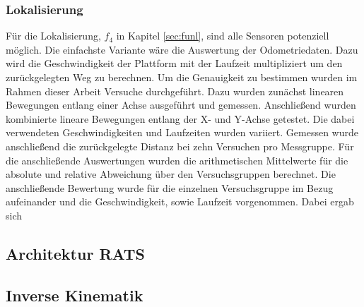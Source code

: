 \subsubsection{Lokalisierung}
Für die Lokalisierung, $f_4$ in Kapitel \ref{sec:funl}, sind alle Sensoren potenziell möglich. Die einfachste Variante wäre die Auswertung der Odometriedaten. Dazu wird die Geschwindigkeit der Plattform mit der Laufzeit multipliziert um den zurückgelegten Weg zu berechnen. Um die Genauigkeit zu bestimmen wurden im Rahmen dieser Arbeit Versuche durchgeführt. Dazu wurden zunächst linearen Bewegungen entlang einer Achse ausgeführt und gemessen. Anschließend wurden kombinierte lineare Bewegungen entlang der X- und Y-Achse getestet. Die dabei verwendeten Geschwindigkeiten und Laufzeiten wurden variiert. Gemessen wurde anschließend die zurückgelegte Distanz bei zehn Versuchen pro Messgruppe. Für die anschließende Auswertungen wurden die arithmetischen Mittelwerte für die absolute und relative Abweichung über den Versuchsgruppen berechnet. Die anschließende Bewertung wurde für die einzelnen Versuchsgruppe im Bezug aufeinander und die Geschwindigkeit, sowie Laufzeit vorgenommen. Dabei ergab sich



\subsection{Architektur RATS}
\subsection{Inverse Kinematik}

